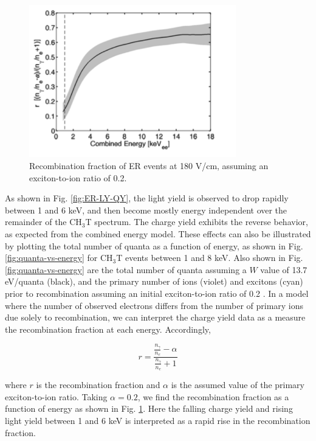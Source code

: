 \begin{figure}[h!]\centering
\includegraphics[width=90mm]{fig/recombination.png}
\caption{Recombination fraction of ER events at 180 V/cm, assuming an exciton-to-ion ratio of 0.2.}
\label{fig:recombination}
\end{figure}


As shown in Fig. \ref{fig:ER-LY-QY}, the light yield is observed to drop rapidly between 1 and 6 keV, and then become mostly energy independent over the remainder of the CH$_3$T spectrum. The charge yield exhibits the reverse behavior, as expected from the combined energy model. These effects can also be illustrated by plotting the total number of quanta as a function of energy, as shown in Fig. \ref{fig:quanta-vs-energy} for CH$_3$T events between 1 and 8 keV. Also shown in Fig. \ref{fig:quanta-vs-energy} are the total number of quanta assuming a $W$ value of 13.7 eV/quanta (black), and the primary number of ions (violet) and excitons (cyan) prior to recombination assuming an initial exciton-to-ion ratio of 0.2 \cite{XXXX}. In a model where the number of observed electrons differs from the number of primary ions due solely to recombination, we can interpret the charge yield data as a measure the recombination fraction at each energy. Accordingly, 

\begin{displaymath}
r = \frac{\frac{n_{\gamma}}{n_e} - \alpha}{\frac{n_{\gamma}}{n_e} + 1}
\end{displaymath}

\noindent
where $r$ is the recombination fraction and $\alpha$ is the assumed value of the primary exciton-to-ion ratio. Taking $\alpha = 0.2$, we find the recombination fraction as a function of energy as shown in Fig. \ref{fig:recombination}. Here the falling charge yield and rising light yield between 1 and 6 keV is interpreted as a rapid rise in the recombination fraction. 


